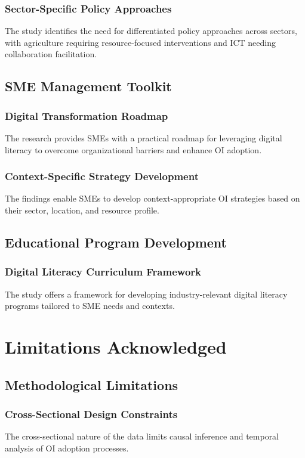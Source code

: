 \subsubsection{Sector-Specific Policy Approaches}
The study identifies the need for differentiated policy approaches across sectors, with agriculture requiring resource-focused interventions and ICT needing collaboration facilitation.

\subsection{SME Management Toolkit}

\subsubsection{Digital Transformation Roadmap}
The research provides SMEs with a practical roadmap for leveraging digital literacy to overcome organizational barriers and enhance OI adoption.

\subsubsection{Context-Specific Strategy Development}
The findings enable SMEs to develop context-appropriate OI strategies based on their sector, location, and resource profile.

\subsection{Educational Program Development}

\subsubsection{Digital Literacy Curriculum Framework}
The study offers a framework for developing industry-relevant digital literacy programs tailored to SME needs and contexts.

\section{Limitations Acknowledged}

\subsection{Methodological Limitations}

\subsubsection{Cross-Sectional Design Constraints}
The cross-sectional nature of the data limits causal inference and temporal analysis of OI adoption processes.

